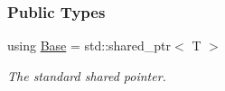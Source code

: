 \subsubsection*{Public Types}
\begin{DoxyCompactItemize}
\item 
using \hyperlink{classderef__shared__ptr_a805d2a5f7dc7ecab217dba0077efee8c}{Base} = std\+::shared\+\_\+ptr$<$ T $>$\hypertarget{classderef__shared__ptr_a805d2a5f7dc7ecab217dba0077efee8c}{}\label{classderef__shared__ptr_a805d2a5f7dc7ecab217dba0077efee8c}

\begin{DoxyCompactList}\small\item\em The standard shared pointer. \end{DoxyCompactList}\end{DoxyCompactItemize}
